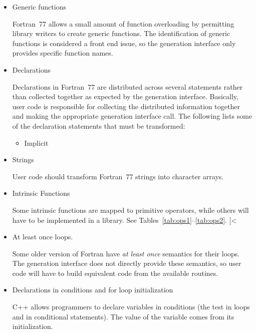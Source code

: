 \begin{itemize}
\item Generic functions

Fortran~77 allows a small amount of function overloading by permitting
library writers to create generic functions.  The identification of
generic functions is considered a front end issue, so the generation
interface only provides specific function names.

\item Declarations

Declarations in Fortran~77 are distributed across several statements
rather than collected together as expected by the generation interface.  
Basically, user code is responsible for collecting the distributed
information together and making the appropriate generation interface
call.  The following lists some of the declaration statements that
must be transformed:
\begin{itemize}
\item Implicit
\end{itemize}

\item Strings

User code should transform Fortran~77 strings into character arrays.

\item Intrinsic Functions

Some intrinsic functions are mapped to primitive operators, while
others will have to be implemented in a library.  See
Tables~\ref{tab:ops1}--\ref{tab:ops2}.  
[<
\item At least once  loops.

Some older version of Fortran have \emph{at least once} semantics for
their  loops.  The generation interface does not directly
provide these semantics, so user code will have to build equivalent
code from the available routines.

\end{itemize}


\begin{itemize}
\item Declarations in conditions and for loop initialization

C++ allows programmers to declare variables in conditions (\ie the
test in loops and in conditional statements).  The value of the
variable comes from its initialization.
\end{itemize}
